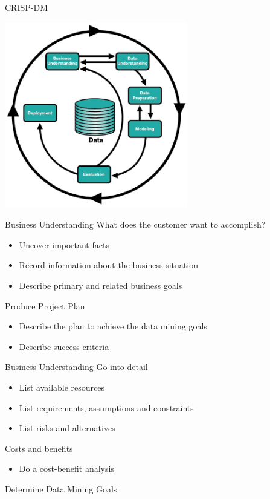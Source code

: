 \documentclass{beamer}
\begin{document}
	\begin{frame}{CRISP-DM}
    \begin{center}
    		\includegraphics[width=0.6\textwidth]{figures/introduction/newcrispdiagram.png}
    \end{center}
	\end{frame}
	
	\begin{frame}{Business Understanding}
		What does the customer want to accomplish?
		\begin{itemize}
			\item Uncover important facts
			\item Record information about the business situation
			\item Describe primary and related business goals
		\end{itemize}
        \bigskip
		Produce Project Plan
		\begin{itemize}
			\item Describe the plan to achieve the data mining goals
			\item Describe success criteria
		\end{itemize}
	\end{frame}
    
	\begin{frame}{Business Understanding}
		Go into detail
		\begin{itemize}
			\item List available resources
			\item List requirements, assumptions and constraints
			\item List risks and alternatives
		\end{itemize}
        \bigskip
		Costs and benefits
		\begin{itemize}
			\item Do a cost-benefit analysis
		\end{itemize}
        \bigskip
		Determine Data Mining Goals
	\end{frame}
	
\end{document}
